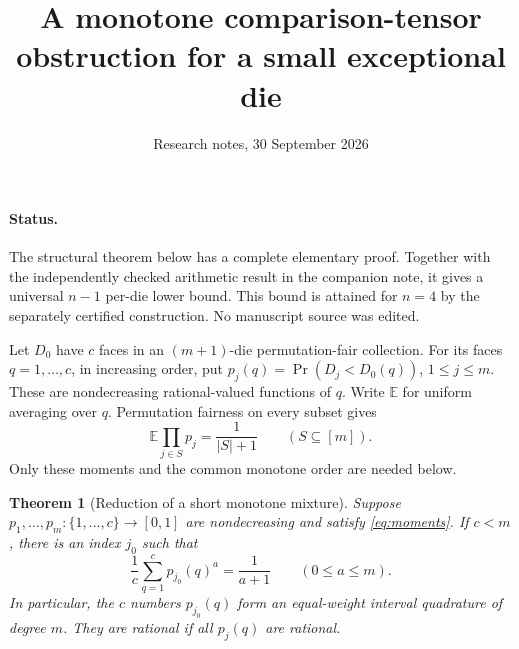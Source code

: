 \documentclass[11pt]{article}
\newtheorem{theorem}{Theorem}
\newcommand{\E}{\mathbb E}
\begin{document}
\title{A monotone comparison-tensor obstruction for a small exceptional die}
\author{Research notes, 30 September 2026}
\maketitle

\paragraph{Status.} The structural theorem below has a complete elementary
proof. Together with the independently checked arithmetic result in the
companion note, it gives a universal $n-1$ per-die lower bound. This bound
is attained for $n=4$ by the separately certified construction.
No manuscript source was edited.

Let $D_0$ have $c$ faces in an $(m+1)$-die permutation-fair collection.
For its faces $q=1,\ldots,c$, in increasing order, put
$p_j(q)=\Pr(D_j<D_0(q))$, $1\leq j\leq m$.  These are nondecreasing
rational-valued functions of $q$.  Write $\E$ for uniform averaging over $q$.
Permutation fairness on every subset gives
\begin{equation}\label{eq:moments}
 \E\prod_{j\in S}p_j=\frac1{|S|+1}
 \qquad(S\subseteq[m]).
\end{equation}
Only these moments and the common monotone order are needed below.

\begin{theorem}[Reduction of a short monotone mixture]\label{thm:reduction}
Suppose $p_1,\ldots,p_m:\{1,\ldots,c\}\to[0,1]$ are nondecreasing
and satisfy \eqref{eq:moments}. If $c<m$, there is an index $j_0$ such that
\[
 \frac1c\sum_{q=1}^c p_{j_0}(q)^a=\frac1{a+1}
 \qquad(0\leq a\leq m).
\]
In particular, the $c$ numbers $p_{j_0}(q)$ form an equal-weight interval
quadrature of degree $m$. They are rational if all $p_j(q)$ are rational.
\end{theorem}
\end{document}
